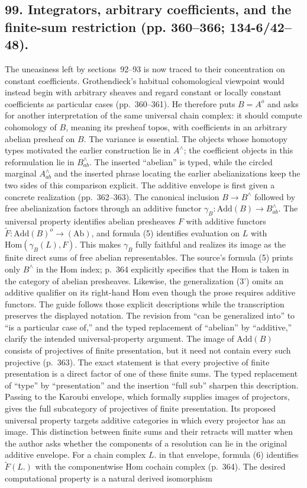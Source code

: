\documentclass[10pt,oneside]{book}
\begin{document}
\subsection*{99. Integrators, arbitrary coefficients, and the finite-sum restriction (pp. 360--366; 134-6/42--48).}
The uneasiness left by sections~92--93 is now traced to their concentration on constant coefficients. Grothendieck's habitual cohomological viewpoint would instead begin with arbitrary sheaves and regard constant or locally constant coefficients as particular cases (pp.~360--361). He therefore puts $B=A^o$ and asks for another interpretation of the same universal chain complex: it should compute cohomology of $B$, meaning its presheaf topos, with coefficients in an arbitrary abelian presheaf on $B$. The variance is essential. The objects whose homotopy types motivated the earlier construction lie in $A^{\wedge}$; the coefficient objects in this reformulation lie in $B^{\wedge}_{ab}$. The inserted ``abelian'' is typed, while the circled marginal $A^{\wedge}_{ab}$ and the inserted phrase locating the earlier abelianizations keep the two sides of this comparison explicit. The additive envelope is first given a concrete realization (pp.~362--363). The canonical inclusion $B\to B^{\wedge}$ followed by free abelianization factors through an additive functor $\gamma_B:\mathrm{Add}(B)\to B^{\wedge}_{ab}$. The universal property identifies abelian presheaves $F$ with additive functors $\widetilde F:\mathrm{Add}(B)^o\to(\mathrm{Ab})$, and formula (5) identifies evaluation on $L$ with $\mathrm{Hom}(\gamma_B(L),F)$. This makes $\gamma_B$ fully faithful and realizes its image as the finite direct sums of free abelian representables. The source's formula (5) prints only $B^{\wedge}$ in the Hom index; p.~364 explicitly specifies that the Hom is taken in the category of abelian presheaves. Likewise, the generalization (3') omits an additive qualifier on its right-hand Hom even though the prose requires additive functors. The guide follows those explicit descriptions while the transcription preserves the displayed notation. The revision from ``can be generalized into'' to ``is a particular case of,'' and the typed replacement of ``abelian'' by ``additive,'' clarify the intended universal-property argument. The image of $\mathrm{Add}(B)$ consists of projectives of finite presentation, but it need not contain every such projective (p.~363). The exact statement is that every projective of finite presentation is a direct factor of one of these finite sums. The typed replacement of ``type'' by ``presentation'' and the insertion ``full sub'' sharpen this description. Passing to the Karoubi envelope, which formally supplies images of projectors, gives the full subcategory of projectives of finite presentation. Its proposed universal property targets additive categories in which every projector has an image. This distinction between finite sums and their retracts will matter when the author asks whether the components of a resolution can lie in the original additive envelope. For a chain complex $L.$ in that envelope, formula (6) identifies $\widetilde F(L.)$ with the componentwise Hom cochain complex (p.~364). The desired computational property is a natural derived isomorphism 
\end{document}
